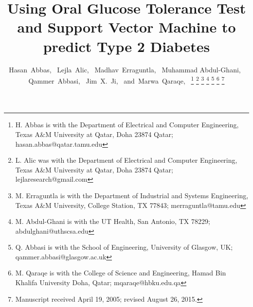 \documentclass[journal,comsoc]{IEEEtran}
\renewcommand{\^}{\hat}  %
\begin{document}
%
\title{Using Oral Glucose Tolerance Test and Support Vector Machine to predict Type 2 Diabetes}
%
%

\author{Hasan~Abbas,~
Lejla~Alic,~
Madhav~Erraguntla,~
Muhammad Abdul-Ghani,~
Qammer~Abbasi,~
Jim~X.~Ji,~
and~Marwa~Qaraqe,~%
\thanks{H. Abbas is with the Department
of Electrical and Computer Engineering, Texas A\&M University at Qatar, Doha 23874 Qatar;  hasan.abbas@qatar.tamu.edu}%
\thanks{L. Alic was with the Department
of Electrical and Computer Engineering, Texas A\&M University at Qatar, Doha 23874 Qatar; lejlaresearch@gmail.com}%
\thanks{M. Erraguntla is with the Department of Industrial and Systems Engineering, Texas A\&M University, College Station, TX 77843; merraguntla@tamu.edu}%
\thanks{M. Abdul-Ghani is with the UT Health, San Antonio, TX 78229; abdulghani@uthscsa.edu}%
\thanks{Q. Abbasi is with the School of Engineering, University of Glasgow, UK; qammer.abbasi@glasgow.ac.uk}%
\thanks{M. Qaraqe is with the College of Science and Engineering, Hamad Bin Khalifa University Doha, Qatar; mqaraqe@hbku.edu.qa}%
\thanks{Manuscript received April 19, 2005; revised August 26, 2015.}}

%
%
\end{document}
